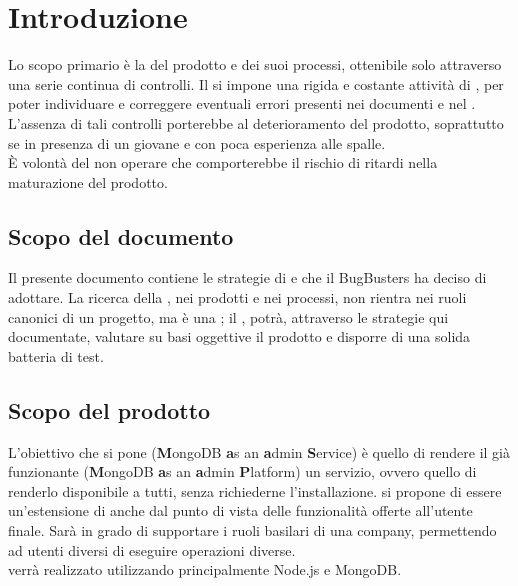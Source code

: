 \section{Introduzione}
Lo scopo primario è la  del prodotto e dei suoi processi, ottenibile solo attraverso una serie continua di controlli. Il  si impone una rigida e costante attività di , per poter individuare e correggere eventuali errori presenti nei documenti e nel . L'assenza di tali controlli porterebbe al deterioramento del prodotto, soprattutto se in presenza di un  giovane e con poca esperienza alle spalle. \\
È volontà del  non operare  che comporterebbe il rischio di ritardi nella maturazione del prodotto.

\subsection{Scopo del documento}
Il presente documento contiene le strategie di  e  che il  BugBusters ha deciso di adottare. La ricerca della , nei prodotti e nei processi, non rientra nei ruoli canonici di un progetto, ma è una ; il , potrà, attraverso le strategie qui documentate, valutare su basi oggettive il prodotto e disporre di una solida batteria di test.

\subsection{Scopo del prodotto}
L'obiettivo che si pone  (\textbf{M}ongoDB \textbf{a}s an \textbf{a}dmin \textbf{S}ervice) è quello di rendere il già funzionante  (\textbf{M}ongoDB \textbf{a}s an \textbf{a}dmin \textbf{P}latform) un servizio, ovvero quello di renderlo disponibile a tutti, senza richiederne l'installazione.  si propone di essere un'estensione di  anche dal punto di vista delle funzionalità offerte all'utente finale. Sarà in grado di supportare i ruoli basilari di una company, permettendo ad utenti diversi di eseguire operazioni diverse. \\
 verrà realizzato utilizzando principalmente Node.js e MongoDB.

